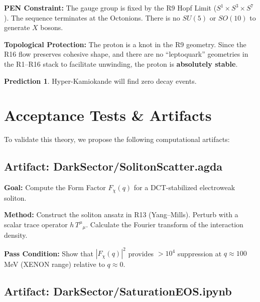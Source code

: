 \documentclass[11pt,a4paper]{article}
\theoremstyle{definition}
\newtheorem{prediction}{Prediction}
\theoremstyle{plain}
\theoremstyle{remark}
\begin{document}
\textbf{PEN Constraint:} The gauge group is fixed by the R9 Hopf Limit ($S^1 \times S^3 \times S^7$). The sequence terminates at the Octonions. There is no $SU(5)$ or $SO(10)$ to generate $X$ bosons.

\textbf{Topological Protection:} The proton is a knot in the R9 geometry. Since the R16 flow preserves cohesive shape, and there are no ``leptoquark'' geometries in the R1--R16 stack to facilitate unwinding, the proton is \textbf{absolutely stable}.

\begin{prediction}
Hyper-Kamiokande will find zero decay events.
\end{prediction}

\section{Acceptance Tests \& Artifacts}

To validate this theory, we propose the following computational artifacts:

\subsection{Artifact: DarkSector/SolitonScatter.agda}

\textbf{Goal:} Compute the Form Factor $F_\chi(q)$ for a DCT-stabilized electroweak soliton.

\textbf{Method:} Construct the soliton ansatz in R13 (Yang--Mills). Perturb with a scalar trace operator $h\,T^\mu{}_\mu$. Calculate the Fourier transform of the interaction density.

\textbf{Pass Condition:} Show that $|F_\chi(q)|^2$ provides $>10^4$ suppression at $q \approx 100$\,MeV (XENON range) relative to $q \approx 0$.

\subsection{Artifact: DarkSector/SaturationEOS.ipynb}
\end{document}
